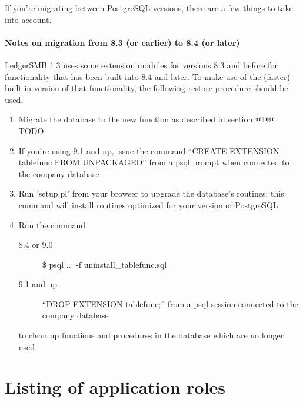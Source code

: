 If you're migrating between PostgreSQL versions, there are a few things to take
into account.


\subsubsection{Notes on migration from 8.3 (or earlier) to 8.4 (or later)}
\label{subsec-migration-pre84-to84plus}



LedgerSMB 1.3 uses some extension modules for versions 8.3 and before for functionality
that has been built into 8.4 and later. To make use of the (faster) built in version
of that functionality, the following restore procedure should be used.

\begin{enumerate}
\item Migrate the database to the new function as described in section @@@ TODO
\item If you're using 9.1 and up, issue the command ``CREATE EXTENSION tablefunc FROM UNPACKAGED''
   from a psql prompt when connected to the company database
\item Run 'setup.pl' from your browser to upgrade the database's routines; this command will
   install routines optimized for your version of PostgreSQL
\item Run the command
	\begin{description}
	\item [8.4 or 9.0] \$ psql ... -f uninstall\_tablefunc.sql
	\item [9.1 and up] ``DROP EXTENSION tablefunc;'' from a psql session connected
		to the company database
	\end{description}
	to clean up functions and procedures in the database which are no longer used
\end{enumerate}


\chapter{Listing of application roles}
\label{app-role-listing}

